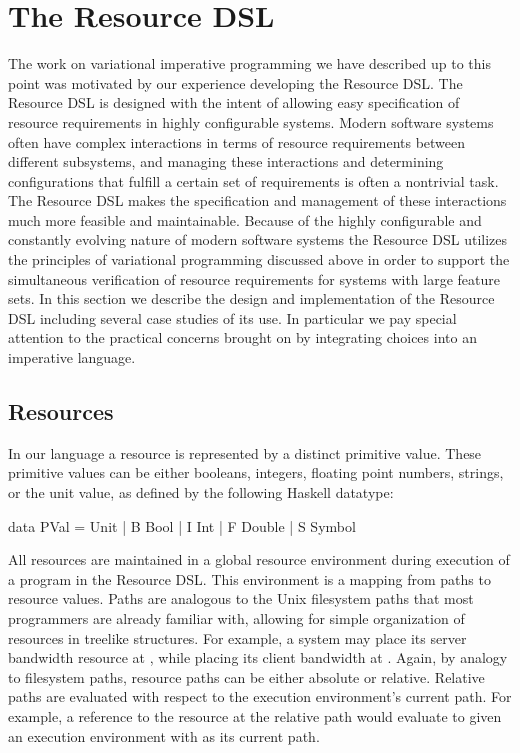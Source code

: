 \documentclass[letterpaper,10pt,onecolumn]{article}
\begin{document}
\section{The Resource DSL}

The work on variational imperative programming we have described up to this point was motivated
by our experience developing the Resource DSL. The Resource DSL is designed with the intent of
allowing easy specification of resource requirements in highly configurable systems. Modern software
systems often have complex interactions in terms of resource requirements between different subsystems,
and managing these interactions and determining configurations that fulfill a certain set of requirements
is often a nontrivial task. The Resource DSL makes the specification and management
of these interactions much more feasible and maintainable. Because of the highly configurable and constantly evolving
nature of modern software systems the Resource DSL utilizes the principles of variational programming
discussed above in order to support the simultaneous verification of resource requirements for
systems with large feature sets. In this section we describe the design and implementation of the
Resource DSL including several case studies of its use. In particular we pay special attention to the
practical concerns brought on by integrating choices into an imperative language.

\subsection{Resources}

In our language a resource is represented by a distinct primitive value. These primitive values
can be either booleans, integers, floating point numbers, strings, or the unit value, as defined
by the following Haskell datatype:

\begin{program}
data PVal
     = Unit
     | B Bool
     | I Int
     | F Double
     | S Symbol
\end{program}

All resources are maintained in a global resource environment during execution of a program
in the Resource DSL. This environment is a mapping from paths to resource values. Paths are
analogous to the Unix filesystem paths that most programmers are already familiar with, allowing for
simple organization of resources in treelike structures. For example, a system may place its server
bandwidth resource at , while placing its client bandwidth at .
Again, by analogy to filesystem paths, resource paths can be either absolute or relative. Relative paths are
evaluated with respect to the execution environment's current path. For example, a reference to the resource
at the relative path  would evaluate to 
given an execution environment with  as its current path.
\end{document}
